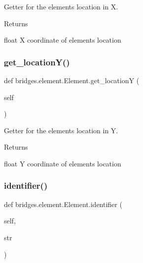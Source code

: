 Getter for the element\textquotesingle{}s location in X. 

\begin{DoxyReturn}{Returns}


float X coordinate of element\textquotesingle{}s location 
\end{DoxyReturn}
\mbox{\label{classbridges_1_1element_1_1_element_a108f62843d084beaf5fcf5fd202853c5}} 
\subsubsection{\texorpdfstring{get\+\_\+location\+Y()}{get\_locationY()}}
{\footnotesize\ttfamily def bridges.\+element.\+Element.\+get\+\_\+locationY (\begin{DoxyParamCaption}\item[{}]{self }\end{DoxyParamCaption})}



Getter for the element\textquotesingle{}s location in Y. 

\begin{DoxyReturn}{Returns}


float Y coordinate of element\textquotesingle{}s location 
\end{DoxyReturn}
\mbox{\label{classbridges_1_1element_1_1_element_a8eb98e53169fc83f6adde36e1896cf2f}} 
\subsubsection{\texorpdfstring{identifier()}{identifier()}\hspace{0.1cm}{\footnotesize\ttfamily [1/2]}}
{\footnotesize\ttfamily def bridges.\+element.\+Element.\+identifier (\begin{DoxyParamCaption}\item[{}]{self,  }\item[{}]{str }\end{DoxyParamCaption})}



